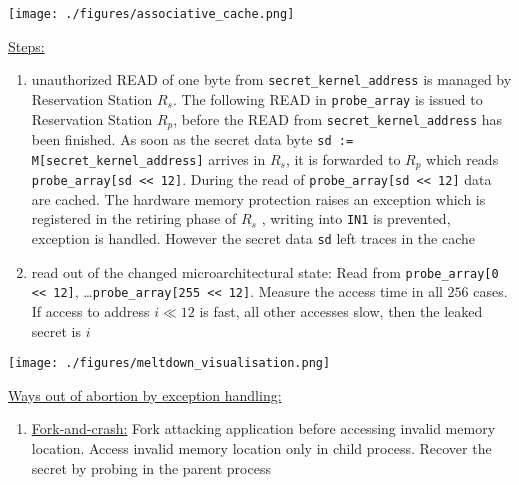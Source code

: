 \documentclass[landscape, a4paper]{article}
\begin{document}
\begin{minipage}[t]{0.2\linewidth}
\begin{betterlist}
\begin{enumerate}
			\texttt{[image: ./figures/associative\_cache.png]}
		\end{enumerate}
		\item \underline{Steps:}
		\begin{enumerate}
			\item unauthorized READ of one byte from \verb|secret_kernel_address| is managed by Reservation Station $R_s$. The following READ in \verb|probe_array| is issued to Reservation Station $R_p$, before the READ from \verb|secret_kernel_address| has been finished. As soon as the secret data byte \verb|sd := M[secret_kernel_address]| arrives in $R_s$, it is forwarded to $R_p$ which reads \verb|probe_array[sd << 12]|. During the read of \verb|probe_array[sd << 12]| data are cached. The hardware memory protection raises an exception which is registered in the retiring phase of $R_s$ , writing into \verb|IN1| is prevented, exception is handled. However the secret data \verb|sd| left traces in the cache
			\item read out of the changed microarchitectural state: Read from \verb|probe_array[0 << 12]|, \ldots \verb|probe_array[255 << 12]|. Measure the access time in all $256$ cases. If access to address $i \ll 12$ is fast, all other accesses slow, then the leaked secret is $i$
		\end{enumerate}
		\texttt{[image: ./figures/meltdown\_visualisation.png]}
		\item \underline{Ways out of abortion by exception handling:}
		\begin{enumerate}
			\item \underline{Fork-and-crash:} Fork attacking application before accessing invalid memory location. Access invalid memory location only in child process. Recover the secret by probing in the parent process

\end{enumerate}
\end{betterlist}
\end{minipage}
\end{document}

